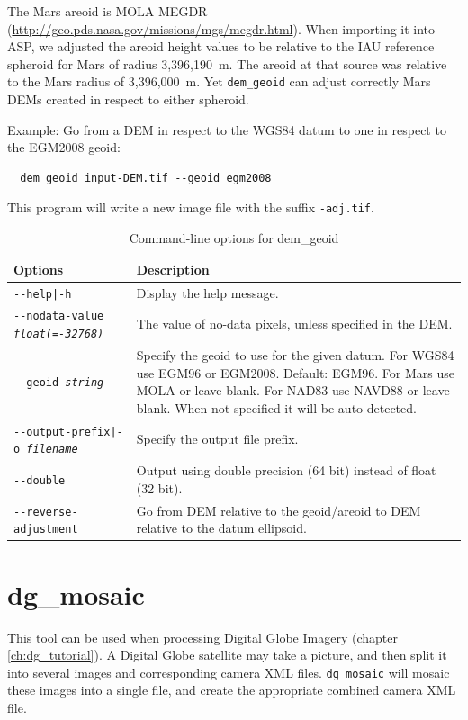 The Mars areoid is MOLA MEGDR
(\url{http://geo.pds.nasa.gov/missions/mgs/megdr.html}). When importing
it into ASP, we adjusted the areoid height values to be relative to
the IAU reference spheroid for Mars of radius 3,396,190~m. The areoid at that source was
relative to the Mars radius of 3,396,000~m. Yet \texttt{dem\_geoid} can adjust
correctly Mars DEMs created in respect to either spheroid.

Example: Go from a DEM in respect to the WGS84 datum to one in respect to the EGM2008 geoid:
\begin{verbatim}
  dem_geoid input-DEM.tif --geoid egm2008
\end{verbatim}
This program will write a new image file with the suffix {\tt *-adj.tif}.

\begin{longtable}{|l|p{10cm}|}
\caption{Command-line options for dem\_geoid}
\label{tbl:demgeoid}
\endfirsthead
\endhead
\endfoot
\endlastfoot
\hline
Options & Description \\ \hline \hline
\texttt{-\/-help|-h} & Display the help message.\\ \hline
\texttt{-\/-nodata-value \textit{float(=-32768)}} & The value of no-data pixels, unless specified in the DEM. \\ \hline
\texttt{-\/-geoid \textit{string}} &Specify the geoid to use for the given datum. For WGS84 use EGM96 or EGM2008. Default: EGM96. For Mars use MOLA or leave blank. For NAD83 use NAVD88 or leave blank. When not specified it will be auto-detected. \\ \hline
\texttt{-\/-output-prefix|-o \textit{filename}} & Specify the output file prefix. \\ \hline
\texttt{-\/-double} & Output using double precision (64 bit) instead of float (32 bit).\\ \hline
\texttt{-\/-reverse-adjustment} & Go from DEM relative to the geoid/areoid to DEM relative to the datum ellipsoid.\\ \hline
\end{longtable}

\section{dg\_mosaic}
\label{dgmosaic}

This tool can be used when processing Digital Globe Imagery (chapter
\ref{ch:dg_tutorial}). A Digital Globe satellite may take a
picture, and then split it into several images and corresponding camera
XML files. \texttt{dg\_mosaic} will mosaic these images into a single
file, and create the appropriate combined camera XML file.

